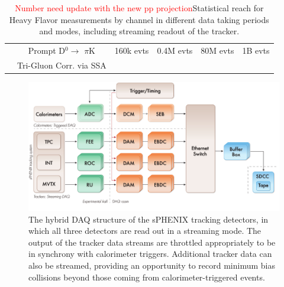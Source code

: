 \begin{table}
\begin{tabular}{|c|c|c|c|c|c|}
        &
        Prompt D$^{0} \rightarrow$ $\pi$K  
        & 160k evts  
        & 0.4M evts
        & 80M evts 
        & 1B evts \\ 
         & Tri-Gluon Corr. via SSA 
        &   
        &  
        & 
        &  \\ \hline 
        
    \end{tabular}
    \caption{{\textcolor{red}{Number need update with the new pp
          projection}}Statistical reach for Heavy Flavor \pp
      measurements by channel in different data taking periods and
      modes, including streaming readout of the tracker.}
    \label{tab:HFppreach}
\end{table}
 

\begin{figure}[htbp]
\begin{center}
\includegraphics[width=.8\linewidth]{figs/DAQ structure_rev3.pdf}
\caption{The hybrid DAQ structure of the sPHENIX tracking detectors,
  in which all three detectors are read out in a streaming mode. The
  output of the tracker data streams are throttled appropriately to be
  in synchrony with calorimeter triggers. Additional tracker data can
  also be streamed, providing an opportunity to record minimum bias
  collisions beyond those coming from calorimeter-triggered events.}
\label{fig:TPC-DAQ-structure}
\end{center}
\end{figure}
